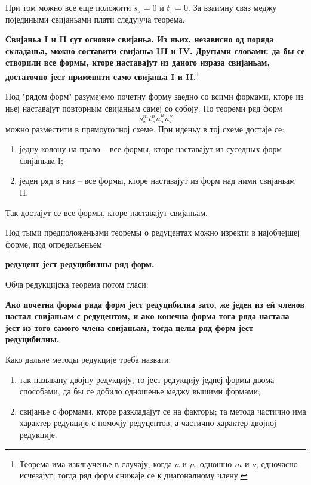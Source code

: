 ﻿\documentclass[11pt]{article}
\begin{document}
При том можно все еще положити $s_\sigma=0$ и $t_\tau=0$. За взаимну связ меджу поједиными свијаньами плати следујуча теорема.

\textbf{Свијаньа I и II сут основне свијаньа. Из ньих, независно од поряда складаньа, можно составити свијаньа III и IV. Другыми словами: да бы се створили все формы, кторе наставајут из даного израза свијаньам, достаточно јест применяти само свијаньа I и II.}\footnote{Теорема има изкльученье в случају, когда $n$ и $\mu$, одношно $m$ и $\nu$, едночасно исчезајут; тогда ряд форм снижаје се к диагоналному члену.}

Под "рядом форм" разумејемо почетну форму заедно со всими формами, кторе из ньеј наставајут повторным свијаньам самеј со собоју. По теореми ряд форм
\[
s_x^m t_x^n u_\sigma^\mu u_\tau^\nu
\]
можно разместити в прямоуголној схеме. При иденьу в тој схеме достаје се:
\begin{enumerate}
\item једну колону на право -- все формы, кторе наставајут из суседных форм свијаньам I;
\item једен ряд в низ -- все формы, кторе наставајут из форм над ними свијаньам II.
\end{enumerate}
Так достајут се все формы, кторе наставајут свијаньам.

Под тыми предположеньами теоремы о редуцентах можно изректи в најобчејшеј форме, под определьеньем
\begin{center}
\textbf{редуцент јест редуцибилны ряд форм.}
\end{center}
Обча редукцијска теорема потом гласи:

\begin{center}
\textbf{Ако почетна форма ряда форм јест редуцибилна зато, же једен из ей членов настал свијаньам с редуцентом, и ако конечна форма тога ряда настала јест из того самого члена свијаньам, тогда целы ряд форм јест редуцибилны.}
\end{center}

Како дальне методы редукције треба назвати:
\begin{enumerate}
\item так называну двојну редукцију, то јест редукцију једнеј формы двома способами, да бы се добило одношенье меджу вышими формами;
\item свијанье с формами, кторе разкладајут се на факторы; та метода частично има характер редукције с помочју редуцентов, а частично характер двојној редукције.
\end{enumerate}
\end{document}

